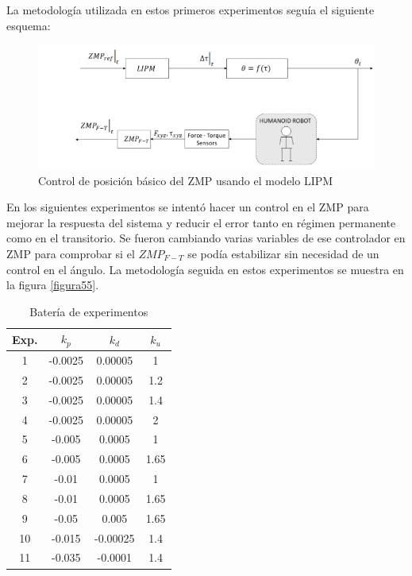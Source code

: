 La metodología utilizada en estos primeros experimentos seguía el siguiente esquema:

\begin{figure}[H]
\centering
\includegraphics[scale=2.2]{imagenes/apartado_5/5.1/51_esquema1}
\caption{Control de posición básico del ZMP usando el modelo LIPM}
\label{figura51}
\end{figure}






En los siguientes experimentos se intentó hacer un control en el ZMP para mejorar la respuesta del sistema y reducir el error tanto en régimen permanente como en el transitorio. Se fueron cambiando varias variables de ese controlador en ZMP para comprobar si el $ZMP_{F-T}$ se podía estabilizar sin necesidad de un control en el ángulo. La metodología seguida en estos experimentos se muestra en la figura \ref{figura55}.

\begin{table}[H]
\begin{center}
\begin{tabular}{|c|c|c|c|}
\hline
Exp. & $k_p$   & $k_d$    & $k_u$ \\ \hline
1    & -0.0025 & 0.00005  & 1    \\ \hline
2    & -0.0025 & 0.00005  & 1.2  \\ \hline
3    & -0.0025 & 0.00005  & 1.4  \\ \hline
4    & -0.0025 & 0.00005  & 2    \\ \hline
5    & -0.005  & 0.0005   & 1    \\ \hline
6    & -0.005  & 0.0005   & 1.65 \\ \hline
7    & -0.01   & 0.0005   & 1    \\ \hline
8    & -0.01   & 0.0005   & 1.65 \\ \hline
9    & -0.05   & 0.005    & 1.65 \\ \hline
10   & -0.015  & -0.00025 & 1.4  \\ \hline
11   & -0.035  & -0.0001  & 1.4  \\ \hline
\end{tabular}
\end{center}
\caption{Batería de experimentos}
\label{tabla51}
\end{table}

